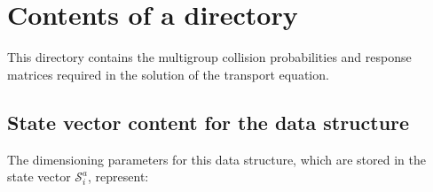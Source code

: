 \section{Contents of a  directory}\label{sect:asminfodir}

This directory contains the multigroup collision probabilities and response matrices 
required in the solution of the transport equation.

\subsection{State vector content for the  data structure}\label{sect:asminfostate}

The dimensioning parameters for this data structure, which are stored in the state vector
$\mathcal{S}^{a}_{i}$, represent:

